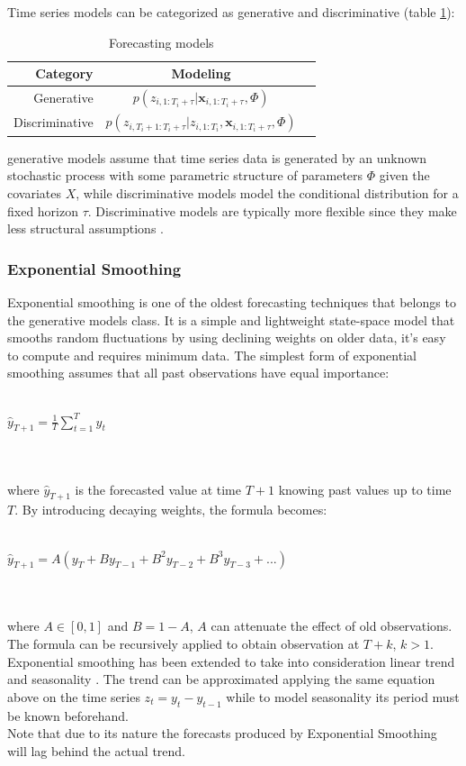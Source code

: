 \documentclass[a4paper, 12pt]{article} %
\newcommand{\ra}[1]{\renewcommand{\arraystretch}{#1}}
\begin{document}
	Time series models can be categorized as generative and discriminative \cite{DiscriminativeGenerativeModels} (table \ref{table:generativediscriminative}):
	\begin{table}\centering 
		\ra{1.3}
		\begin{tabular}{@{}rcr@{}}\toprule
			Category & Modeling\\
			 \midrule
			 Generative & $p(z_{i,1:T_i+\tau} | \pmb{x}_{i, 1:T_i + \tau}, \Phi)$\\
			 Discriminative &  $p(z_{i,T_{i}+1:T_i+\tau} | z_{i, 1:T_i}, \pmb{x}_{i, 1:T_i + \tau}, \Phi)$\\
			\bottomrule
		\end{tabular}
		\caption{Forecasting models} \label{table:generativediscriminative}
	\end{table}
	generative models assume that time series data is generated by an unknown stochastic process with some parametric structure of parameters $\Phi$ given the covariates $X$, while discriminative models model the conditional distribution for a fixed horizon $\tau$. Discriminative models are typically more flexible since they make less structural assumptions \cite{GluonTS}.
	
	
	\subsubsection{Exponential Smoothing} \label{sssec:exponential_smoothing}
	Exponential smoothing \cite{ExponentialSmoothingHoltCharles} is one of the oldest forecasting techniques that belongs to the generative models class. It is a simple and lightweight state-space model that smooths random fluctuations by using declining weights on older data, it's easy to compute and requires minimum data.
	The simplest form of exponential smoothing assumes that all past observations have equal importance:\\\\
	\centerline{$\hat{y}_{T+1} = \frac{1}{T} \sum_{t=1}^{T}y_t$}\\\\
	where $\hat{y}_{T+1}$ is the forecasted value at time $T+1$ knowing past values up to time $T$. By introducing decaying weights, the formula becomes:\\\\
		\centerline{$\hat{y}_{T+1} = A(y_T + B y_{T-1} + B^2 y_{T-2} + B^3 y_{T-3} + ...)$ }\\\\
	where $A \in [0,1]$ and $B=1-A$, $A$ can attenuate the effect of old observations. The formula can be recursively applied to obtain observation at $T+k$, $k>1$. \\
	Exponential smoothing has been extended to take into consideration linear trend and seasonality \cite{ExponentialSmoothingHoltCharles}. The trend can be approximated applying the same equation above on the time series $z_t = y_t - y_{t-1}$ while to model seasonality its period must be known beforehand.\\
	Note that due to its nature the forecasts produced by Exponential Smoothing will lag behind the actual trend.
	
\end{document}
